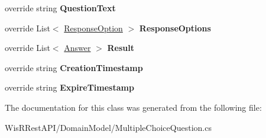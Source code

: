 \begin{DoxyCompactItemize}
\item 
\hypertarget{class_wis_r_1_1_domain_models_1_1_multiple_choice_question_a245ee5a32da292c49b6004523d16c70b}{}override string {\bfseries Question\+Text}\label{class_wis_r_1_1_domain_models_1_1_multiple_choice_question_a245ee5a32da292c49b6004523d16c70b}

\item 
\hypertarget{class_wis_r_1_1_domain_models_1_1_multiple_choice_question_acb7e074147a402b7ad55b972982d8127}{}override List$<$ \hyperlink{class_wis_r_1_1_domain_models_1_1_response_option}{Response\+Option} $>$ {\bfseries Response\+Options}\label{class_wis_r_1_1_domain_models_1_1_multiple_choice_question_acb7e074147a402b7ad55b972982d8127}

\item 
\hypertarget{class_wis_r_1_1_domain_models_1_1_multiple_choice_question_af285bdac3c73e5c107ec7cbe83ca36b5}{}override List$<$ \hyperlink{class_wis_r_1_1_domain_models_1_1_answer}{Answer} $>$ {\bfseries Result}\label{class_wis_r_1_1_domain_models_1_1_multiple_choice_question_af285bdac3c73e5c107ec7cbe83ca36b5}

\item 
\hypertarget{class_wis_r_1_1_domain_models_1_1_multiple_choice_question_a8204d6961298ead5b4ad91f4f3f25ef8}{}override string {\bfseries Creation\+Timestamp}\label{class_wis_r_1_1_domain_models_1_1_multiple_choice_question_a8204d6961298ead5b4ad91f4f3f25ef8}

\item 
\hypertarget{class_wis_r_1_1_domain_models_1_1_multiple_choice_question_aa6c1cf9cfcd379223ddadea2a5c3cefd}{}override string {\bfseries Expire\+Timestamp}\label{class_wis_r_1_1_domain_models_1_1_multiple_choice_question_aa6c1cf9cfcd379223ddadea2a5c3cefd}

\end{DoxyCompactItemize}


The documentation for this class was generated from the following file\+:\begin{DoxyCompactItemize}
\item 
Wis\+R\+Rest\+A\+P\+I/\+Domain\+Model/Multiple\+Choice\+Question.\+cs\end{DoxyCompactItemize}
